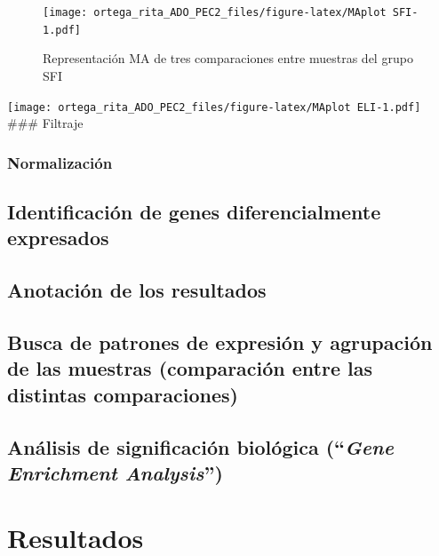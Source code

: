 \documentclass[
  english,
]{article}
\begin{document}
\begin{figure}
\centering
\texttt{[image: ortega\_rita\_ADO\_PEC2\_files/figure-latex/MAplot SFI-1.pdf]}
\caption{Representación MA de tres comparaciones entre muestras del
grupo SFI}
\end{figure}

\texttt{[image: ortega\_rita\_ADO\_PEC2\_files/figure-latex/MAplot ELI-1.pdf]}
\#\#\# Filtraje

\hypertarget{normalizaciuxf3n}{%
\subsubsection{Normalización}\label{normalizaciuxf3n}}

\hypertarget{identificaciuxf3n-de-genes-diferencialmente-expresados}{%
\subsection{Identificación de genes diferencialmente
expresados}\label{identificaciuxf3n-de-genes-diferencialmente-expresados}}

\hypertarget{anotaciuxf3n-de-los-resultados}{%
\subsection{Anotación de los
resultados}\label{anotaciuxf3n-de-los-resultados}}

\hypertarget{busca-de-patrones-de-expresiuxf3n-y-agrupaciuxf3n-de-las-muestras-comparaciuxf3n-entre-las-distintas-comparaciones}{%
\subsection{Busca de patrones de expresión y agrupación de las muestras
(comparación entre las distintas
comparaciones)}\label{busca-de-patrones-de-expresiuxf3n-y-agrupaciuxf3n-de-las-muestras-comparaciuxf3n-entre-las-distintas-comparaciones}}

\hypertarget{anuxe1lisis-de-significaciuxf3n-bioluxf3gica-gene-enrichment-analysis}{%
\subsection{\texorpdfstring{Análisis de significación biológica
(``\emph{Gene Enrichment
Analysis}'')}{Análisis de significación biológica (``Gene Enrichment Analysis'')}}\label{anuxe1lisis-de-significaciuxf3n-bioluxf3gica-gene-enrichment-analysis}}

\hypertarget{resultados}{%
\section{Resultados}\label{resultados}}
\end{document}
